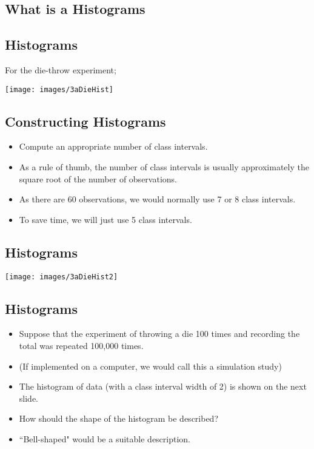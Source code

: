 \documentclass[]{report}
\begin{document}
{
\subsection{What is a Histograms}



}

{
\subsection{Histograms}
For the die-throw experiment;
\begin{center}
\texttt{[image: images/3aDieHist]}
\end{center}

}
{
\subsection{Constructing Histograms}
\begin{itemize}
\item Compute an appropriate number of class intervals.
\item As a rule of thumb, the number of class intervals is usually approximately the square root of the number of observations.
\item As there are 60 observations, we would normally use 7 or 8 class intervals.
\item To save time, we will just use 5 class intervals.
\end{itemize}

}



\subsection{Histograms}

\begin{center}
\texttt{[image: images/3aDieHist2]}
\end{center}



\subsection{Histograms}
\begin{itemize}
\item Suppose that the experiment of throwing a die 100 times and recording the total was repeated 100,000 times.
\item (If implemented on a computer, we would call this a simulation study)
\item The histogram of data (with a class interval width of 2) is shown on the next slide.
\item How should the shape of the histogram be described?
\item ``Bell-shaped" would be a suitable description.
\end{itemize}
\end{document}
